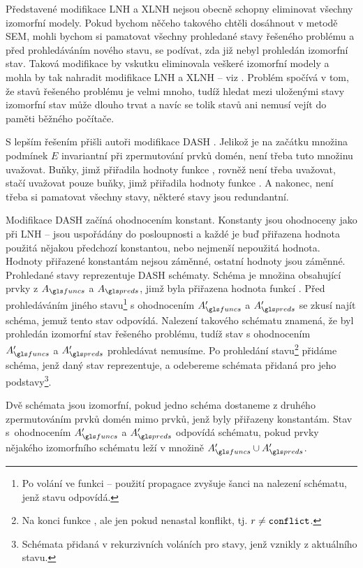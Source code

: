 Představené modifikace LNH a XLNH nejsou obecně schopny eliminovat všechny
izomorfní modely. Pokud bychom něčeho takového chtěli dosáhnout
v metodě SEM, mohli bychom si pamatovat všechny prohledané
stavy řešeného problému a před prohledáváním nového stavu,
se podívat, zda již nebyl prohledán izomorfní stav.
Taková modifikace by vskutku eliminovala veškeré izomorfní modely
a mohla by tak nahradit modifikace LNH a XLNH -- viz
\cite{audemard2001symmetry}.
Problém spočívá v tom, že stavů řešeného problému
je velmi mnoho, tudíž hledat mezi uloženými stavy izomorfní stav může
dlouho trvat a navíc se tolik stavů ani nemusí vejít do paměti
běžného počítače.

S lepším řešením přišli autoři modifikace DASH \cite{dash}.
Jelikož je na začátku množina podmínek $E$ invariantní
při zpermutování prvků domén, není třeba tuto množinu uvažovat.
Buňky, jimž přiřadila hodnoty funkce ,
rovněž není třeba uvažovat, stačí uvažovat pouze buňky,
jimž přiřadila hodnoty funkce .
A nakonec, není třeba si pamatovat všechny stavy,
některé stavy jsou redundantní.

Modifikace DASH začíná ohodnocením konstant.
Konstanty jsou ohodnoceny jako při LNH -- jsou uspořádány do posloupnosti
a každé je buď přiřazena hodnota použitá nějakou předchozí konstantou,
nebo nejmenší nepoužitá hodnota. Hodnoty přiřazené konstantám
nejsou záměnné, ostatní hodnoty jsou záměnné.
Prohledané stavy reprezentuje DASH schématy. Schéma je množina
obsahující prvky z $A_\funcs$ a $A_\preds$, jimž byla přiřazena
hodnota funkcí . Před prohledáváním jiného
stavu\footnote{Po volání  ve funkci  --
použití propagace zvyšuje šanci na nalezení schématu, jenž
stavu odpovídá.}
s ohodnocením $A'_\funcs$ a $A'_\preds$ se zkusí najít schéma,
jemuž tento stav odpovídá. Nalezení takového schématu znamená,
že byl prohledán izomorfní stav řešeného problému, tudíž
stav s ohodnocením $A'_\funcs$ a $A'_\preds$ prohledávat nemusíme.
Po prohledání stavu\footnote{Na konci funkce ,
ale jen pokud nenastal konflikt, tj. $r \neq \text{\texttt{conflict}}$.}
přidáme schéma, jenž daný stav reprezentuje,
a odebereme schémata přidaná pro jeho
podstavy\footnote{Schémata přidaná v rekurzivních voláních pro stavy,
jenž vznikly z aktuálního stavu.}.

Dvě schémata jsou izomorfní,
pokud jedno schéma dostaneme z druhého zpermutováním prvků domén mimo
prvků, jenž byly přiřazeny konstantám.
Stav s~ohodnocením $A'_\funcs$ a $A'_\preds$ odpovídá schématu, pokud
prvky nějakého izomorfního schématu leží v množině $A'_\funcs \cup A'_\preds$.

